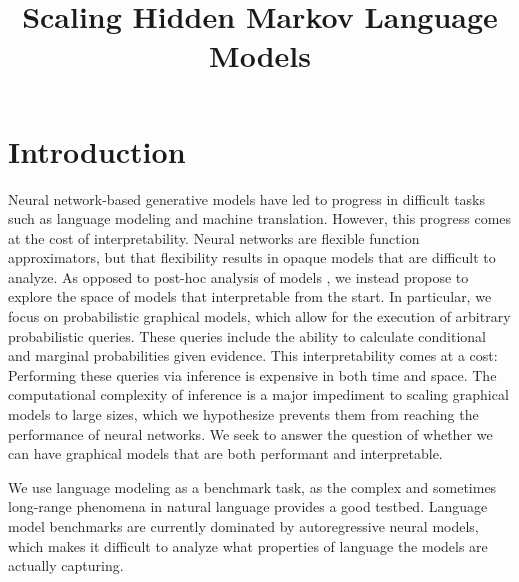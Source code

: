 \documentclass{article}
\title{Scaling Hidden Markov Language Models}
\begin{document}
\maketitle


\section{Introduction}
Neural network-based generative models have led to progress in
difficult tasks such as language modeling and machine translation.
However, this progress comes at the cost of interpretability.
Neural networks are flexible function approximators,
but that flexibility results in opaque models that are difficult to analyze.
As opposed to post-hoc analysis of models \citep{tenney2019probing},
we instead propose to explore
the space of models that interpretable from the start.
In particular, we focus on probabilistic graphical models,
which allow for the execution of arbitrary probabilistic queries.
These queries include
the ability to calculate conditional and marginal probabilities given evidence.
This interpretability comes at a cost:
Performing these queries via inference is expensive in both time and space.
The computational complexity of inference is a major impediment to scaling
graphical models to large sizes, which we hypothesize prevents them from
reaching the performance of neural networks.
We seek to answer the question of whether we can have graphical models that are both
performant and interpretable.

We use language modeling as a benchmark task, as the complex 
and sometimes long-range phenomena in natural language provides a good testbed.
Language model benchmarks are currently dominated by autoregressive neural models,
which makes it difficult to analyze what properties of language the models are
actually capturing.
\end{document}
